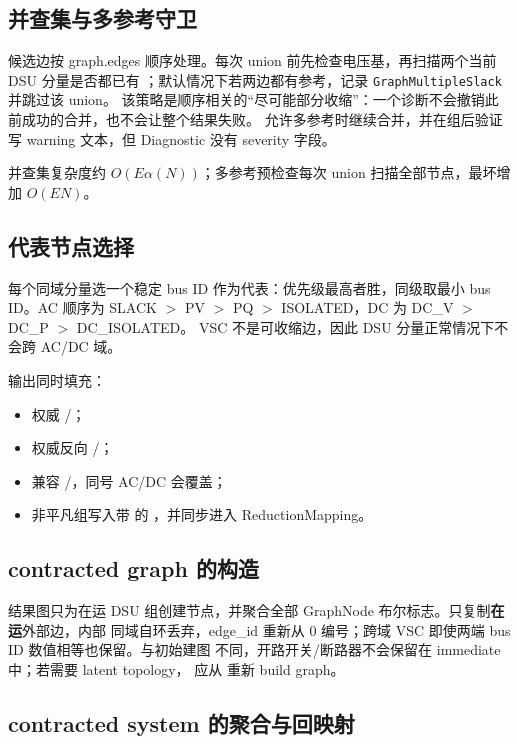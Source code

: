 \subsection{并查集与多参考守卫}

候选边按 graph.edges 顺序处理。每次 union 前先检查电压基，再扫描两个当前 DSU 分量是否都已有
；默认情况下若两边都有参考，记录 \texttt{GraphMultipleSlack} 并跳过该 union。
该策略是顺序相关的“尽可能部分收缩”：一个诊断不会撤销此前成功的合并，也不会让整个结果失败。
允许多参考时继续合并，并在组后验证写 warning 文本，但 Diagnostic 没有 severity 字段。

并查集复杂度约 $O(E\alpha(N))$；多参考预检查每次 union 扫描全部节点，最坏增加 $O(EN)$。

\subsection{代表节点选择}

每个同域分量选一个稳定 bus ID 作为代表：优先级最高者胜，同级取最小 bus ID。AC 顺序为
SLACK $>$ PV $>$ PQ $>$ ISOLATED，DC 为 DC\_V $>$ DC\_P $>$ DC\_ISOLATED。
VSC 不是可收缩边，因此 DSU 分量正常情况下不会跨 AC/DC 域。

输出同时填充：
\begin{itemize}
  \item 权威 /；
  \item 权威反向 /；
  \item 兼容 /，同号 AC/DC 会覆盖；
  \item 非平凡组写入带  的 ，并同步进入 ReductionMapping。
\end{itemize}

\subsection{contracted graph 的构造}

结果图只为在运 DSU 组创建节点，并聚合全部 GraphNode 布尔标志。只复制\textbf{在运}外部边，内部
同域自环丢弃，edge\_id 重新从 0 编号；跨域 VSC 即使两端 bus ID 数值相等也保留。与初始建图
不同，开路开关/断路器不会保留在 immediate  中；若需要 latent topology，
应从  重新 build graph。

\subsection{contracted system 的聚合与回映射}


